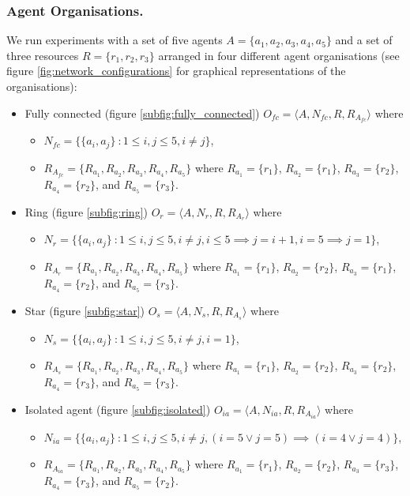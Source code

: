 \documentclass{llncs}
\begin{document}
\subsubsection{Agent Organisations.}
We run experiments with a set of five agents $A= \{ a_1,a_2,a_3,a_4,a_5 \} $ and a set of  three resources $R=\{r_1,r_2,r_3\}$ arranged in four different agent organisations (see figure \ref{fig:network_configurations} for graphical representations of the organisations):
\begin{itemize}
 \item Fully connected (figure \ref{subfig:fully_connected}) $O_{fc}=\langle A, N_{fc}, R, R_{A_{fc}}  \rangle$ where
    \begin{itemize}
    \item $N_{fc}=\{\{a_i,a_j \}\ : 1 \le i,j \le 5, i\neq j \}$,
    \item $R_{A_{fc}}=\{R_{a_1}, R_{a_2}, R_{a_3}, R_{a_4}, R_{a_5}\}$ where $R_{a_1}=\{r_1\}$, $R_{a_2}=\{r_1\}$, $R_{a_3}=\{r_2\}$, $R_{a_4}=\{r_2\}$, and $R_{a_5}=\{r_3\}$.
    \end{itemize}
 \item Ring (figure \ref{subfig:ring}) $O_r=\langle A, N_r, R, R_{A_r}  \rangle$ where
    \begin{itemize}
    \item $N_r=\{\{a_i,a_j \}\ : 1 \le i,j \le 5, i\neq j, i\le 5 \implies j=i+1, i=5 \implies j=1 \}$,
    \item $R_{A_r}=\{R_{a_1}, R_{a_2}, R_{a_3}, R_{a_4}, R_{a_5}\}$ where $R_{a_1}=\{r_1\}$, $R_{a_2}=\{r_2\}$, $R_{a_3}=\{r_1\}$, $R_{a_4}=\{r_2\}$, and $R_{a_5}=\{r_3\}$.
    \end{itemize}
 \item Star (figure \ref{subfig:star}) $O_s=\langle A, N_s, R, R_{A_s}  \rangle$ where
    \begin{itemize}
    \item $N_s=\{\{a_i,a_j \}\ : 1 \le i,j \le 5, i\neq j, i=1 \}$,
    \item $R_{A_s}=\{R_{a_1}, R_{a_2}, R_{a_3}, R_{a_4}, R_{a_5}\}$ where $R_{a_1}=\{r_1\}$, $R_{a_2}=\{r_2\}$, $R_{a_3}=\{r_2\}$, $R_{a_4}=\{r_3\}$, and $R_{a_5}=\{r_3\}$.
    \end{itemize}
 \item Isolated agent (figure \ref{subfig:isolated}) $O_{ia}=\langle A, N_{ia}, R, R_{A_{ia}}  \rangle$ where
    \begin{itemize}
    \item $N_{ia}=\{\{a_i,a_j \}\ : 1 \le i,j \le 5, i\neq j, (i=5 \vee j=5) \implies (i=4 \vee j=4) \}$,
    \item $R_{A_{ia}}=\{R_{a_1}, R_{a_2}, R_{a_3}, R_{a_4}, R_{a_5}\}$ where $R_{a_1}=\{r_1\}$, $R_{a_2}=\{r_2\}$, $R_{a_3}=\{r_3\}$, $R_{a_4}=\{r_3\}$, and $R_{a_5}=\{r_2\}$.
    \end{itemize}
\end{itemize}
\end{document}
